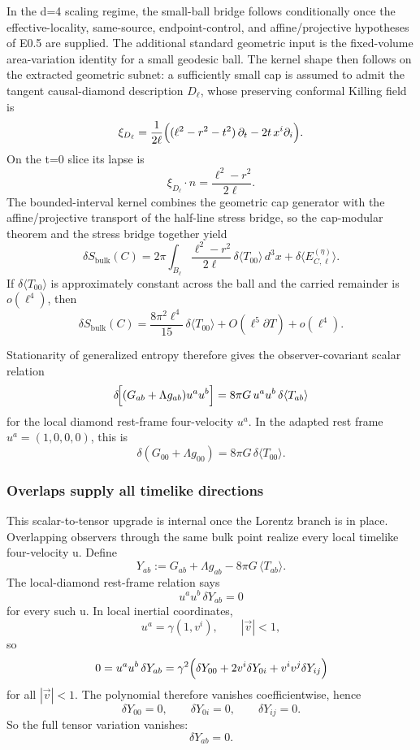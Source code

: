 In the d=4 scaling regime, the small-ball bridge follows conditionally once the effective-locality, same-source, endpoint-control, and affine/projective hypotheses of E0.5 are supplied. The additional standard geometric input is the fixed-volume area-variation identity for a small geodesic ball. The kernel shape then follows on the extracted geometric subnet: a sufficiently small cap is assumed to admit the tangent causal-diamond description \(D_\ell\), whose preserving conformal Killing field is
\[
\xi_{D_\ell}
=
\frac{1}{2\ell}
\Bigl((\ell^2-r^2-t^2)\,\partial_t-2t\,x^i\partial_i\Bigr).
\]
On the t=0 slice its lapse is
\[
\xi_{D_\ell}\!\cdot n=\frac{\ell^2-r^2}{2\ell}.
\]
The bounded-interval kernel combines the geometric cap generator with the affine/projective transport of the half-line stress bridge, so the cap-modular theorem and the stress bridge together yield
\[
\delta S_{\mathrm{bulk}}(C)
=
2\pi\int_{B_\ell}\frac{\ell^2-r^2}{2\ell}\,\delta\langle T_{00}\rangle\,d^3x
+
\delta\langle E^{(\eta)}_{C,\ell}\rangle.
\]
If \(\delta\langle T_{00}\rangle\) is approximately constant across the ball and the carried remainder is \(o(\ell^4)\), then
\[
\delta S_{\mathrm{bulk}}(C)
=
\frac{8\pi^2\ell^4}{15}\,\delta\langle T_{00}\rangle
+O(\ell^5\partial T)+o(\ell^4).
\]

Stationarity of generalized entropy therefore gives the observer-covariant scalar relation
\[
\delta\!\Bigl[(G_{ab}+\Lambda g_{ab})u^a u^b\Bigr]
=
8\pi G\,u^a u^b\,\delta\langle T_{ab}\rangle
\]
for the local diamond rest-frame four-velocity \(u^a\). In the adapted rest frame \(u^a=(1,0,0,0)\), this is
\[
\delta\!\left(G_{00}+\Lambda g_{00}\right)=8\pi G\,\delta\langle T_{00}\rangle.
\]

\subsubsection{Overlaps supply all timelike directions}\label{57-overlaps-supply-all-timelike-directions}

This scalar-to-tensor upgrade is internal once the Lorentz branch is in place. Overlapping observers through the same bulk point realize every local timelike four-velocity u. Define
\[
Y_{ab}:=G_{ab}+\Lambda g_{ab}-8\pi G\,\langle T_{ab}\rangle.
\]
The local-diamond rest-frame relation says
\[
u^a u^b\,\delta Y_{ab}=0
\]
for every such u. In local inertial coordinates,
\[
u^a=\gamma(1,v^i),
\qquad
|\vec v|<1,
\]
so
\[
0
=
u^a u^b\,\delta Y_{ab}
=
\gamma^2\Bigl(\delta Y_{00}+2v^i\delta Y_{0i}+v^iv^j\delta Y_{ij}\Bigr)
\]
for all \(|\vec v|<1\). The polynomial therefore vanishes coefficientwise, hence
\[
\delta Y_{00}=0,\qquad
\delta Y_{0i}=0,\qquad
\delta Y_{ij}=0.
\]
So the full tensor variation vanishes:
\[
\delta Y_{ab}=0.
\]

